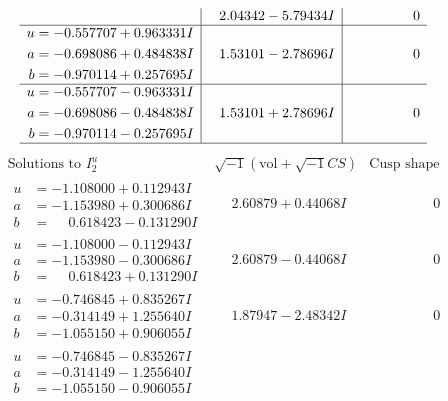 \documentclass[1p]{elsarticle_modified}
\theoremstyle{definition}
\newcommand{\I}{\sqrt{-1}}
\begin{document}
$$\begin{array}{c|c|c}
 & \phantom{-}2.04342 - 5.79434 I & \phantom{-0.000000 } 0 \\ \hline\begin{aligned}
u &= -0.557707 + 0.963331 I \\
a &= -0.698086 + 0.484838 I \\
b &= -0.970114 + 0.257695 I\end{aligned}
 & \phantom{-}1.53101 - 2.78696 I & \phantom{-0.000000 } 0 \\ \hline\begin{aligned}
u &= -0.557707 - 0.963331 I \\
a &= -0.698086 - 0.484838 I \\
b &= -0.970114 - 0.257695 I\end{aligned}
 & \phantom{-}1.53101 + 2.78696 I & \phantom{-0.000000 } 0\\
 \hline 
 \end{array}$$\newpage$$\begin{array}{c|c|c}  
\text{Solutions to }I^u_{2}& \I (\text{vol} + \sqrt{-1}CS) & \text{Cusp shape}\\
 \hline 
\begin{aligned}
u &= -1.108000 + 0.112943 I \\
a &= -1.153980 + 0.300686 I \\
b &= \phantom{-}0.618423 - 0.131290 I\end{aligned}
 & \phantom{-}2.60879 + 0.44068 I & \phantom{-0.000000 } 0 \\ \hline\begin{aligned}
u &= -1.108000 - 0.112943 I \\
a &= -1.153980 - 0.300686 I \\
b &= \phantom{-}0.618423 + 0.131290 I\end{aligned}
 & \phantom{-}2.60879 - 0.44068 I & \phantom{-0.000000 } 0 \\ \hline\begin{aligned}
u &= -0.746845 + 0.835267 I \\
a &= -0.314149 + 1.255640 I \\
b &= -1.055150 + 0.906055 I\end{aligned}
 & \phantom{-}1.87947 - 2.48342 I & \phantom{-0.000000 } 0 \\ \hline\begin{aligned}
u &= -0.746845 - 0.835267 I \\
a &= -0.314149 - 1.255640 I \\
b &= -1.055150 - 0.906055 I\end{aligned}

\end{array}$$
\end{document}
